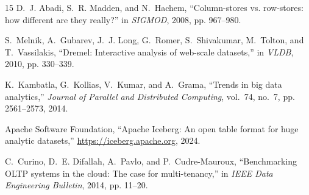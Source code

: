 \documentclass[10pt,journal,compsoc]{IEEEtran}
\begin{document}
\begin{thebibliography}{15}
D.~J. Abadi, S.~R. Madden, and N.~Hachem, ``Column-stores vs. row-stores: how different are they really?'' in \emph{SIGMOD}, 2008, pp. 967--980.

S.~Melnik, A.~Gubarev, J.~J. Long, G.~Romer, S.~Shivakumar, M.~Tolton, and T.~Vassilakis, ``Dremel: Interactive analysis of web-scale datasets,'' in \emph{VLDB}, 2010, pp. 330--339.

K.~Kambatla, G.~Kollias, V.~Kumar, and A.~Grama, ``Trends in big data analytics,'' \emph{Journal of Parallel and Distributed Computing}, vol.~74, no.~7, pp. 2561--2573, 2014.

Apache Software Foundation, ``Apache Iceberg: An open table format for huge analytic datasets,'' \url{https://iceberg.apache.org}, 2024.

C.~Curino, D.~E. Difallah, A.~Pavlo, and P.~Cudre-Mauroux, ``Benchmarking OLTP systems in the cloud: The case for multi-tenancy,'' in \emph{IEEE Data Engineering Bulletin}, 2014, pp. 11--20.
\end{thebibliography}
\end{document}
